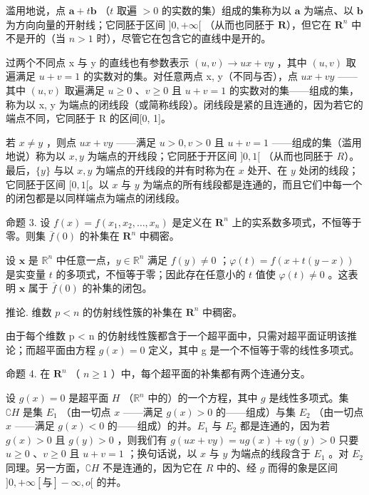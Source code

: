 滥用地说，点 \(\pmb{a} + t\pmb{b}\) （\(t\) 取遍 \(> 0\) 的实数的集）组成的集称为以 \(\pmb{a}\) 为端点、以 \(\pmb{b}\) 为方向向量的开射线；它同胚于区间 \(]0, +\infty[\) （从而也同胚于 \(\mathbf{R}\)），但它在 \(\mathbf{R}^n\) 中不是开的（当 \(n > 1\) 时），尽管它在包含它的直线中是开的。

过两个不同点 x 与 y 的直线也有参数表示 \((u, v) \to ux + vy\) ，其中 \((u, v)\) 取遍满足 \(u + v = 1\) 的实数对的集。对任意两点 x, y（不同与否），点 \(ux + vy\) ——其中 \((u, v)\) 取遍满足 \(u \geqslant 0\) 、\(v \geqslant 0\) 且 \(u + v = 1\) 的实数对的集——组成的集，称为以 x, y 为端点的闭线段（或简称线段）。闭线段是紧的且连通的，因为若它的端点不同，它同胚于 R 的区间{[}0, 1{]}。

若 \(x \neq y\) ，则点 \(ux + vy\) ——满足 \(u > 0, v > 0\) 且 \(u + v = 1\) ——组成的集（滥用地说）称为以 \(x, y\) 为端点的开线段；它同胚于开区间 \(]0, 1[\) （从而也同胚于 \(R\)）。最后，\(\{y\}\) 与以 \(x, y\) 为端点的开线段的并有时称为在 \(x\) 处开、在 \(y\) 处闭的线段；它同胚于区间 \([0, 1[\)。以 \(x\) 与 \(y\) 为端点的所有线段都是连通的，而且它们中每一个的闭包都是以同样端点为端点的闭线段。

命题 3. 设 \(f(x) = f(x_1, x_2, \ldots, x_n)\) 是定义在 \(\mathbf{R}^n\) 上的实系数多项式，不恒等于零。则集 \(\overline{f}(0)\) 的补集在 \(\mathbf{R}^n\) 中稠密。

设 \(\pmb{x}\) 是 \(\mathbb{R}^n\) 中任意一点，\(y \in \mathbb{R}^n\) 满足 \(f(y) \neq 0\) ；\(\varphi(t) = f(x + t(y - x))\) 是实变量 \(t\) 的多项式，不恒等于零；因此存在任意小的 \(t\) 值使 \(\varphi(t) \neq 0\) 。这表明 \(\pmb{x}\) 属于 \(\overline{f}(0)\) 的补集的闭包。

推论. 维数 \(p < n\) 的仿射线性簇的补集在 \(\mathbf{R}^n\) 中稠密。

由于每个维数 p \textless{} n 的仿射线性簇都含于一个超平面中，只需对超平面证明该推论；而超平面由方程 \(g(x) = 0\) 定义，其中 g 是一个不恒等于零的线性多项式。

命题 4. 在 \(\mathbf{R}^n\) （ \(n \geqslant 1\) ）中，每个超平面的补集都有两个连通分支。

设 \(g(x) = 0\) 是超平面 \(H\) （\(\mathbb{R}^n\) 中的）的一个方程，其中 \(g\) 是线性多项式。集 \(\complement H\) 是集 \(E_1\) （由一切点 \(x\) ——满足 \(g(x) > 0\) 的——组成）与集 \(E_2\) （由一切点 \(x\) ——满足 \(g(x) < 0\) 的——组成）的并。\(E_1\) 与 \(E_2\) 都是连通的，因为若 \(g(x) > 0\) 且 \(g(y) > 0\) ，则我们有 \(g(ux + vy) = ug(x) + vg(y) > 0\) 只要 \(u \geqslant 0\) 、\(v \geqslant 0\) 且 \(u + v = 1\) ；换句话说，以 \(x\) 与 \(y\) 为端点的线段含于 \(E_1\) 。对 \(E_2\) 同理。另一方面，\(\complement H\) 不是连通的，因为它在 \(R\) 中的、经 \(g\) 而得的象是区间 \(]0, +\infty[ \text{与}] - \infty, o[\) 的并。

